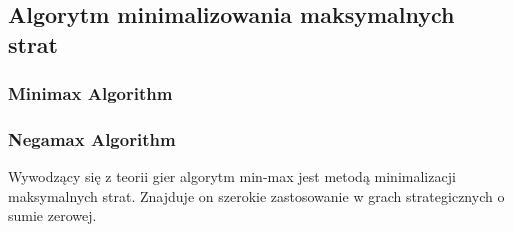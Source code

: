 \subsection{Algorytm minimalizowania maksymalnych strat}
\label{subsec:algorytm-minimalizowania-maksymalnych-strat}

\subsubsection{Minimax Algorithm}

\subsubsection{Negamax Algorithm}

Wywodzący się z teorii gier algorytm min-max jest metodą minimalizacji maksymalnych strat.
Znajduje on szerokie zastosowanie w grach strategicznych o sumie zerowej.
